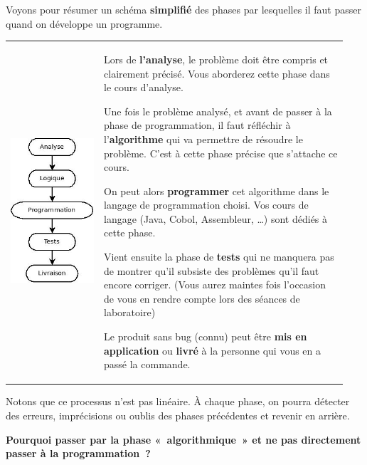 	Voyons pour résumer un schéma \textbf{simplifié} des phases par
	lesquelles il faut passer quand on développe un programme.

	\begin{tabular}{m{0.26\linewidth}m{0.68\linewidth}}
	\includegraphics[width=3.5cm]{image/intro-phases-develop}
	&
	\begin{liste}
	\item 
		Lors de \textbf{l’analyse}, le problème doit être
		compris et clairement précisé. Vous aborderez cette phase dans le cours
		d’analyse.
	\item
		Une fois le problème analysé, et avant de passer à la phase de
		programmation, il faut réfléchir à l’\textbf{algorithme} qui va
		permettre de résoudre le problème. C’est à cette phase précise
		que s’attache ce cours.
	\item
		On peut alors \textbf{programmer} cet algorithme dans le langage de
		programmation choisi. Vos cours de langage (Java, Cobol, 
		Assembleur, \dots) sont dédiés à cette phase.
	\item
		Vient ensuite la phase de \textbf{tests} qui ne manquera pas de montrer
		qu’il subsiste des problèmes qu’il
		faut encore corriger. (Vous aurez maintes fois
		l’occasion de vous en rendre compte lors des
		séances de laboratoire)
	\item
		Le produit sans bug (connu) peut être \textbf{mis en application}
		ou \textbf{livré} à la personne qui vous en a passé la commande.
	\end{liste}
	\\
	\end{tabular}
	
	Notons que ce processus n’est pas linéaire. À chaque
	phase, on pourra détecter des erreurs, imprécisions ou oublis des
	phases précédentes et revenir en arrière.

	\textbf{Pourquoi passer par la phase «~algorithmique~» 
		et ne pas directement passer à la programmation~?}
	

